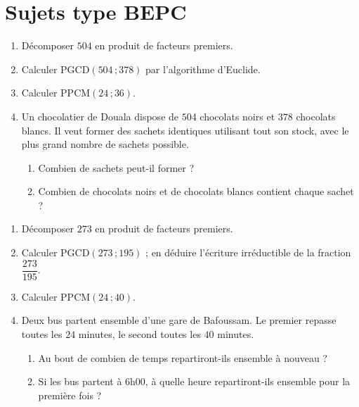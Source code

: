 \section{Sujets type BEPC}

\begin{enumerate}[label=\arabic*)]
\item Décomposer $504$ en produit de facteurs premiers.
\item Calculer $\text{PGCD}(504\,;378)$ par l'algorithme d'Euclide.
\item Calculer $\text{PPCM}(24\,;36)$.
\item Un chocolatier de Douala dispose de $504$ chocolats noirs et $378$ chocolats blancs.
Il veut former des sachets identiques utilisant tout son stock, avec le plus grand nombre
de sachets possible.
\begin{enumerate}[label=\alph*)]
\item Combien de sachets peut-il former ?
\item Combien de chocolats noirs et de chocolats blancs contient chaque sachet ?
\end{enumerate}
\end{enumerate}

\begin{enumerate}[label=\arabic*)]
\item Décomposer $273$ en produit de facteurs premiers.
\item Calculer $\text{PGCD}(273\,;195)$ ; en déduire l'écriture irréductible de la
fraction $\dfrac{273}{195}$.
\item Calculer $\text{PPCM}(24\,;40)$.
\item Deux bus partent ensemble d'une gare de Bafoussam. Le premier repasse toutes les
$24$ minutes, le second toutes les $40$ minutes.
\begin{enumerate}[label=\alph*)]
\item Au bout de combien de temps repartiront-ils ensemble à nouveau ?
\item Si les bus partent à $6$h$00$, à quelle heure repartiront-ils ensemble pour la
première fois ?
\end{enumerate}
\end{enumerate}

